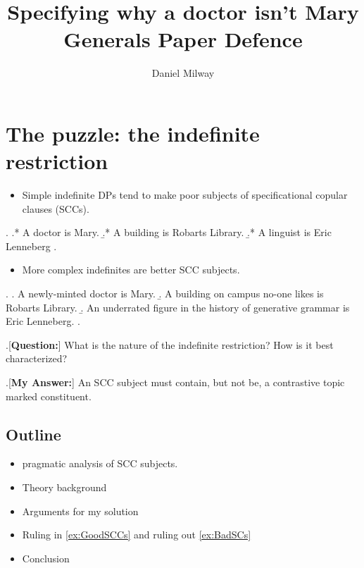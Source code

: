 \documentclass[letterpaper]{article}
\title{Specifying why a doctor isn't Mary\\
  Generals Paper Defence
}
\author{Daniel Milway}
\begin{document}
\maketitle
\maketitle
\section{The puzzle: the indefinite restriction}
\begin{itemize}
  \item Simple indefinite DPs tend to make poor subjects of specificational copular clauses (SCCs).
\end{itemize}
\ex.\label{ex:BadSCs} 
\a.* A doctor is Mary.
\b.* A building is Robarts Library.
\b.* A linguist is Eric Lenneberg
\z.

\begin{itemize}
  \item More complex indefinites are better SCC subjects.
\end{itemize}
\ex.\label{ex:GoodSCCs}
\a. A newly-minted doctor is Mary.
\b. A building on campus no-one likes is Robarts Library.
\b. An underrated figure in the history of generative grammar is Eric Lenneberg.
\z.

\ex.[\textbf{Question:}] What is the nature of the indefinite restriction? How is it best characterized?

\ex.[\textbf{My Answer:}] An SCC subject must contain, but not be, a contrastive topic marked constituent.

\subsection{Outline}
\begin{itemize}
  \item {} pragmatic analysis of SCC subjects. 
  \item Theory background \parencite{buring2003d}
  \item Arguments for my solution
  \item Ruling in \ref{ex:GoodSCCs} and ruling out \ref{ex:BadSCs}
  \item Conclusion
\end{itemize}
\end{document}
